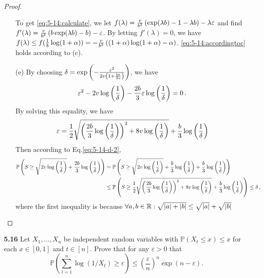 \begin{proof}
\begin{enumerate}
		To get \eqref{eq:5-14:calculate}, we let $f(\lambda)=\frac{v}{b^2}\left(\exp(\lambda b )-1-\lambda b\right) -\lambda \varepsilon$ and find $f'(\lambda) = \frac{v}{b^2}\left( b\exp(\lambda b)-b \right)-\varepsilon$. By letting $f'(\lambda)=0$, we have $f(\lambda) \le f(\frac{1}{b}\log (1+\alpha)) = -\frac{v}{b^2} \left( (1+\alpha)\log(1+\alpha) - \alpha \right) $. \eqref{eq:5-14:accordingtoc} holds according to (c).
		\item[(e)] 
		By choosing $\delta = \exp\left( -\frac{\varepsilon^2}{2v\left(1+\frac{b\varepsilon}{3v}\right)} \right)$, we have
		\begin{align*}
			\varepsilon^2 - 2v\log\left(\frac{1}{\delta}\right) - \frac{2b}{3}\varepsilon\log\left(\frac{1}{\delta}\right) = 0\,.
		\end{align*}
		By solving this equality, we have 
		\begin{align*}
			\varepsilon = \frac{1}{2}\sqrt{ \left(\frac{2b}{3}\log \left(\frac{1}{\delta}\right)\right)^2 + 8v\log \left(\frac{1}{\delta}\right)}+\frac{b}{3}\log \left(\frac{1}{\delta}\right)
		\end{align*}
		Then according to Eq.\eqref{eq:5-14-d-2}, 
		\begin{align*}
		\mathbb{P} \left(S \ge \sqrt{2v\log \left(\frac{1}{\delta}\right)}+\frac{2b}{3}\log \left(\frac{1}{\delta}\right)\right) &= \mathbb{P} \left(S \ge \sqrt{2v\log \left(\frac{1}{\delta}\right)}+\frac{b}{3}\log \left(\frac{1}{\delta}\right)+\frac{b}{3}\log \left(\frac{1}{\delta}\right)\right)\\
			&\le
			\mathbb{P} \left(S \ge \frac{1}{2}\sqrt{ \left(\frac{2b}{3}\log \left(\frac{1}{\delta}\right)\right)^2 + 8v\log \left(\frac{1}{\delta}\right)}+\frac{b}{3}\log \left(\frac{1}{\delta}\right)\right) \le \delta \,,
		\end{align*}
		where the first inequality is because $\forall a,b\in \mathbb{R}: \sqrt{|a|+|b|} \le \sqrt{|a|}+\sqrt{|b|}$




	\end{enumerate}
\end{proof}





\noindent \textbf{5.16}
Let $X_{1}, \ldots, X_{n}$ be independent random variables with $\mathbb{P}\left(X_{t} \leq x\right) \leq x$ for each $x \in[0,1]$ and $t \in[n]$.
Prove that for any $\varepsilon>0$ that
\begin{equation*}
	\mathbb{P}\left(\sum_{t=1}^{n} \log \left(1 / X_{t}\right) \geq \varepsilon\right) \leq\left(\frac{\varepsilon}{n}\right)^{n} \exp (n-\varepsilon).
\end{equation*}

